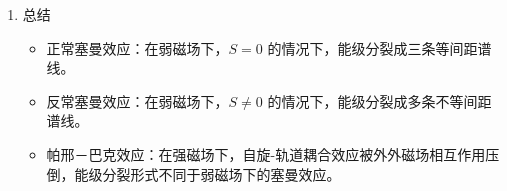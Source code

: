 \documentclass[dvipsnames, svgnames,a4paper,11pt]{article}
\begin{document}
\begin{enumerate}
		帕邢－巴克效应（Paschen-Back Effect）是指在强外磁场中，原子或离子的能级分裂情况不同于弱磁场下的正常或反常塞曼效应。
		\begin{itemize}
			\item 强磁场效应：外磁场强度很大，使得自旋-轨道耦合效应被外磁场的相互作用所压倒。
			\item 能级分裂：在强磁场下，自旋和轨道角动量分别绕外磁场方向进行拉莫尔进动，导致能级分裂的规律变化。
			\item 电子自旋：自旋和轨道角动量不再耦合成总角动量 \(J\)，而是分别与外磁场相互作用。
			\item 形成原因：在强磁场下，自旋-轨道耦合效应变得次要，电子的自旋和轨道角动量分别绕外磁场方向进行拉莫尔进动，导致能级分裂的形式与在弱磁场下的情况不同。
		\end{itemize}
		
		\item 总结
		
		\begin{itemize}
			\item 正常塞曼效应：在弱磁场下，\(S = 0\) 的情况下，能级分裂成三条等间距谱线。
			\item 反常塞曼效应：在弱磁场下，\(S \neq 0\) 的情况下，能级分裂成多条不等间距谱线。
			\item 帕邢－巴克效应：在强磁场下，自旋-轨道耦合效应被外外磁场相互作用压倒，能级分裂形式不同于弱磁场下的塞曼效应。
		\end{itemize}
	\end{enumerate}	
	
\end{document}
